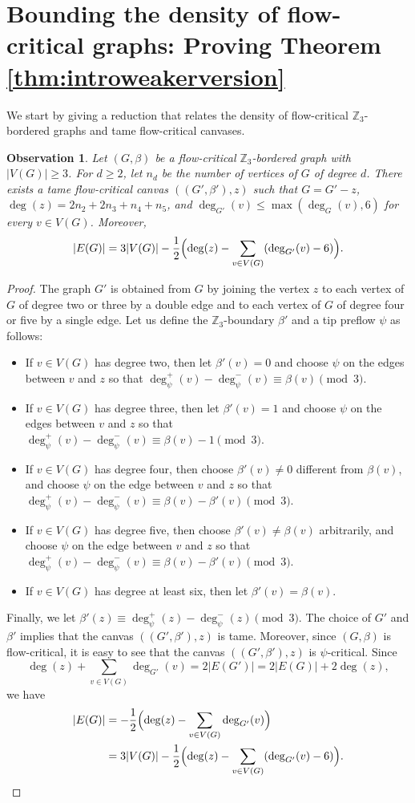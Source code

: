\documentclass{article}
\newcommand{\Z}{\mathbb{Z}_3}
\newtheorem{observation}[theorem]{Observation}
\begin{document}
\section{Bounding the density of flow-critical graphs: Proving Theorem \ref{thm:introweakerversion}}

We start by giving a reduction that relates the density of flow-critical $\Z$-bordered graphs and tame flow-critical canvases. 

\begin{observation}\label{obs-to-tame}
Let $(G,\beta)$ be a flow-critical $\Z$-bordered graph with $|V(G)|\ge 3$.  For $d\ge 2$, let $n_d$ be the number of vertices of $G$ of degree $d$.
There exists a tame flow-critical canvas $((G',\beta'),z)$ such that $G=G'-z$, $\deg(z)=2n_2+2n_3+n_4+n_5$,
and $\deg_{G'}(v)\le \max(\deg_G(v), 6)$ for every $v\in V(G)$.  Moreover,
$$|E(G)|=3|V(G)| - \frac{1}{2}\Bigl(\deg(z) -\sum_{v\in V(G)} (\deg_{G'}(v)-6)\Bigr).$$
\end{observation}
\begin{proof}
The graph $G'$ is obtained from $G$ by joining the vertex $z$ to each vertex of $G$ of degree two or three by a double edge and to each vertex of $G$ of degree four or five by a single edge.
Let us define the $\Z$-boundary $\beta'$ and a tip preflow $\psi$ as follows:
\begin{itemize}
\item If $v\in V(G)$ has degree two, then let $\beta'(v)=0$ and choose $\psi$ on the edges between $v$ and $z$
so that $\deg^+_\psi(v)-\deg^-_\psi(v)\equiv \beta(v)\pmod 3$.
\item If $v\in V(G)$ has degree three, then let $\beta'(v)=1$ and choose $\psi$ on the edges between $v$ and $z$
so that $\deg^+_\psi(v)-\deg^-_\psi(v)\equiv \beta(v)-1\pmod 3$.
\item If $v\in V(G)$ has degree four, then choose $\beta'(v)\neq 0$ different from $\beta(v)$,
and choose $\psi$ on the edge between $v$ and $z$ so that $\deg^+_\psi(v)-\deg^-_\psi(v)\equiv \beta(v)-\beta'(v)\pmod 3$.
\item If $v\in V(G)$ has degree five, then choose $\beta'(v)\neq \beta(v)$ arbitrarily,
and choose $\psi$ on the edge between $v$ and $z$ so that $\deg^+_\psi(v)-\deg^-_\psi(v)\equiv \beta(v)-\beta'(v)\pmod 3$.
\item If $v\in V(G)$ has degree at least six, then let $\beta'(v)=\beta(v)$.
\end{itemize}
Finally, we let $\beta'(z)\equiv \deg^+_\psi(z)-\deg^-_\psi(z)\pmod 3$.
The choice of $G'$ and $\beta'$ implies that the canvas $((G',\beta'),z)$ is tame.
Moreover, since $(G,\beta)$ is flow-critical, it is easy to see that the canvas $((G',\beta'),z)$ is $\psi$-critical.
Since
$$\deg(z) + \sum_{v\in V(G)} \deg_{G'}(v)=2|E(G')|=2|E(G)|+2\deg(z),$$
we have
\begin{align*}
|E(G)|&=-\frac{1}{2}\Bigl(\deg(z)-\sum_{v\in V(G)} \deg_{G'}(v)\Bigr)\\
&=3|V(G)| - \frac{1}{2}\Bigl(\deg(z) -\sum_{v\in V(G)} (\deg_{G'}(v)-6)\Bigr).
\end{align*}
\end{proof}
\end{document}
